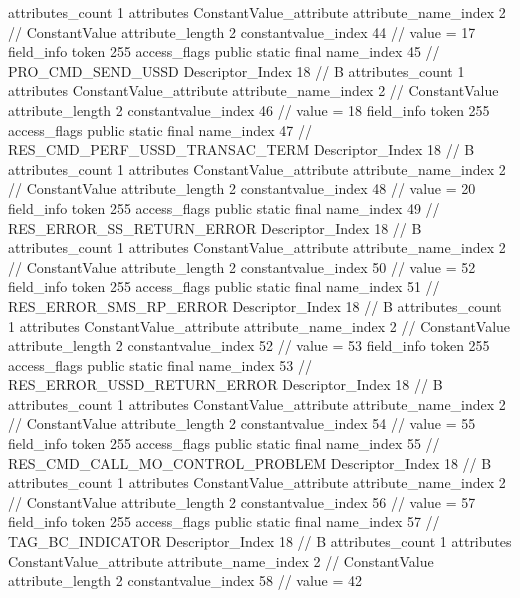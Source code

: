 {{{{{				attributes_count	1
				attributes {
				ConstantValue_attribute {
					attribute_name_index	2		// ConstantValue
					attribute_length	2
					constantvalue_index	44		// value = 17
				}
				}
			}
			field_info {
				token	255
				access_flags	public static final
				name_index	45		// PRO_CMD_SEND_USSD
				Descriptor_Index	18		// B
				attributes_count	1
				attributes {
				ConstantValue_attribute {
					attribute_name_index	2		// ConstantValue
					attribute_length	2
					constantvalue_index	46		// value = 18
				}
				}
			}
			field_info {
				token	255
				access_flags	public static final
				name_index	47		// RES_CMD_PERF_USSD_TRANSAC_TERM
				Descriptor_Index	18		// B
				attributes_count	1
				attributes {
				ConstantValue_attribute {
					attribute_name_index	2		// ConstantValue
					attribute_length	2
					constantvalue_index	48		// value = 20
				}
				}
			}
			field_info {
				token	255
				access_flags	public static final
				name_index	49		// RES_ERROR_SS_RETURN_ERROR
				Descriptor_Index	18		// B
				attributes_count	1
				attributes {
				ConstantValue_attribute {
					attribute_name_index	2		// ConstantValue
					attribute_length	2
					constantvalue_index	50		// value = 52
				}
				}
			}
			field_info {
				token	255
				access_flags	public static final
				name_index	51		// RES_ERROR_SMS_RP_ERROR
				Descriptor_Index	18		// B
				attributes_count	1
				attributes {
				ConstantValue_attribute {
					attribute_name_index	2		// ConstantValue
					attribute_length	2
					constantvalue_index	52		// value = 53
				}
				}
			}
			field_info {
				token	255
				access_flags	public static final
				name_index	53		// RES_ERROR_USSD_RETURN_ERROR
				Descriptor_Index	18		// B
				attributes_count	1
				attributes {
				ConstantValue_attribute {
					attribute_name_index	2		// ConstantValue
					attribute_length	2
					constantvalue_index	54		// value = 55
				}
				}
			}
			field_info {
				token	255
				access_flags	public static final
				name_index	55		// RES_CMD_CALL_MO_CONTROL_PROBLEM
				Descriptor_Index	18		// B
				attributes_count	1
				attributes {
				ConstantValue_attribute {
					attribute_name_index	2		// ConstantValue
					attribute_length	2
					constantvalue_index	56		// value = 57
				}
				}
			}
			field_info {
				token	255
				access_flags	public static final
				name_index	57		// TAG_BC_INDICATOR
				Descriptor_Index	18		// B
				attributes_count	1
				attributes {
				ConstantValue_attribute {
					attribute_name_index	2		// ConstantValue
					attribute_length	2
					constantvalue_index	58		// value = 42
				}
				}
}}}}}
